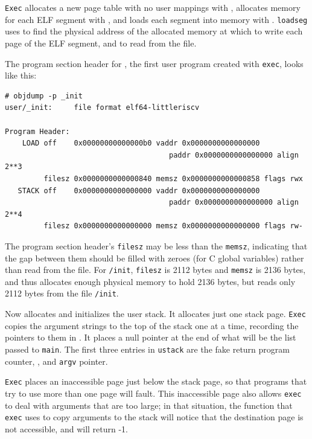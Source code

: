 \lstinline{Exec}
allocates a new page table with no user mappings with
,
allocates memory for each ELF segment with
,
and loads each segment into memory with
.
\lstinline{loadseg}
uses
to find the physical address of the allocated memory at which to write
each page of the ELF segment, and
to read from the file.

The program section header for
,
the first user program created with
\lstinline{exec},
looks like this:
\begin{footnotesize}
\begin{verbatim}
# objdump -p _init
user/_init:     file format elf64-littleriscv

Program Header:
    LOAD off    0x00000000000000b0 vaddr 0x0000000000000000 
                                      paddr 0x0000000000000000 align 2**3
         filesz 0x0000000000000840 memsz 0x0000000000000858 flags rwx
   STACK off    0x0000000000000000 vaddr 0x0000000000000000 
                                      paddr 0x0000000000000000 align 2**4
         filesz 0x0000000000000000 memsz 0x0000000000000000 flags rw-
\end{verbatim}
\end{footnotesize}

The program section header's
\lstinline{filesz}
may be less than the
\lstinline{memsz},
indicating that the gap between them should be filled
with zeroes (for C global variables) rather than read from the file.
For
\lstinline{/init},
\lstinline{filesz}
is 2112 bytes and
\lstinline{memsz}
is 2136 bytes,
and thus
allocates enough physical memory to hold 2136 bytes, but reads only 2112 bytes
from the file
\lstinline{/init}.

Now
allocates and initializes the user stack.
It allocates just one stack page.
\lstinline{Exec}
copies the argument strings to the top of the stack
one at a time, recording the pointers to them in
.
It places a null pointer at the end of what will be the
list passed to
\lstinline{main}.
The first three entries in
\lstinline{ustack}
are the fake return program counter,
,
and
\lstinline{argv}
pointer.

\lstinline{Exec}
places an inaccessible page just below the stack page,
so that programs that try to use more than one page will fault.
This inaccessible page also allows
\lstinline{exec}
to deal with arguments that are too large;
in that situation,
the
function that
\lstinline{exec}
uses to copy arguments to the stack will notice that
the destination page is not accessible, and will
return -1.

